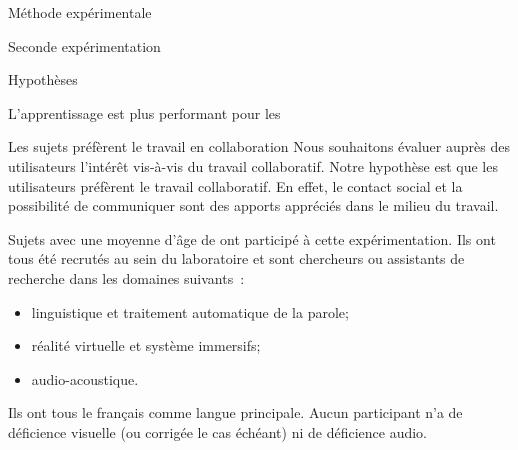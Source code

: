 \documentclass[myfrancais,ngerman,english,frenchb]{mythesis}
\begin{document}
\begin{mychapter}{Méthode expérimentale}
\begin{mysection}{Seconde expérimentation}
\begin{mysubsection}{Hypothèses}
\begin{myparagraph}{ L'apprentissage est plus performant pour les }
				\end{myparagraph}
				\begin{myparagraph}{ Les sujets préfèrent le travail en collaboration}
					Nous souhaitons évaluer auprès des utilisateurs l'intérêt vis-à-vis du travail collaboratif.
					Notre hypothèse est que les utilisateurs préfèrent le travail collaboratif.
					En effet, le contact social et la possibilité de communiquer sont des apports appréciés dans le milieu du travail.
				\end{myparagraph}
			\end{mysubsection}
			\begin{mysubsection}{Sujets}
				 avec une moyenne d'âge de  ont participé à cette expérimentation.
				Ils ont tous été recrutés au sein du laboratoire  et sont chercheurs ou assistants de recherche dans les domaines suivants~:
				\begin{itemize}
					\item linguistique et traitement automatique de la parole;
					\item réalité virtuelle et système immersifs;
					\item audio-acoustique.
				\end{itemize}
				Ils ont tous le français comme langue principale.
				Aucun participant n'a de déficience visuelle (ou corrigée le cas échéant) ni de déficience audio.


\end{mysubsection}
\end{mysection}
\end{mychapter}
\end{document}
